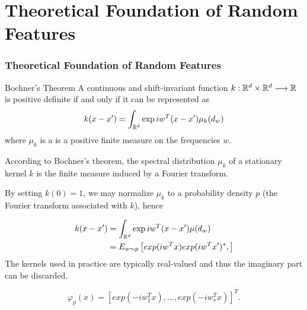 \section{Theoretical Foundation of Random Features}

\begin{frame}
  \frametitle{Theoretical Foundation of Random Features}

  \begin{theorem}{Bochner’s Theorem}
    A continuous and shift-invariant function $k :\mathbb{R}^d  \times \mathbb{R}^d \longrightarrow \mathbb{R}$ 
is positive definite if and only
if it can be represented as
\begin{equation}
  k(x - x')
  = 
  \int_{\mathbb{R}^d} 
    \exp{i w^T (x - x')}
    \mu_k( d_w)
\end{equation}
where $\mu_k$ is a is a positive finite measure on the frequencies 
$w$. 
\end{theorem}
  
According to Bochner's theorem, the spectral distribution $\mu_k$
of a stationary kernel $k$ is the finite measure induced by a Fourier
transform.
\end{frame}


\begin{frame}

  By setting $k(0) = 1$, we may normalize $\mu_k$ to a
probability density $p$ (the Fourier transform associated with $k$),
hence

\begin{align}
  k(x - x')
  & =  
  \int_{\mathbb{R}^d} 
    \exp{i w^T (x - x')}
    \mu( d_w)
  \\ & =  
  E_{w \sim p }
  \left[
    exp{(i w^T x )}
    exp{(i w^T x')^*}, 
  \right]
\end{align}
The
  kernels used in practice are typically real-valued and thus the
  imaginary part can be discarded.

\end{frame}

\begin{frame}

\begin{equation}
  \varphi_p(x)
  = 
  \left[
    exp{(- i w_1^T x )},
    \ldots,
    exp{(-i w^T_s x)}
  \right]^T.
\end{equation}

\end{frame}

